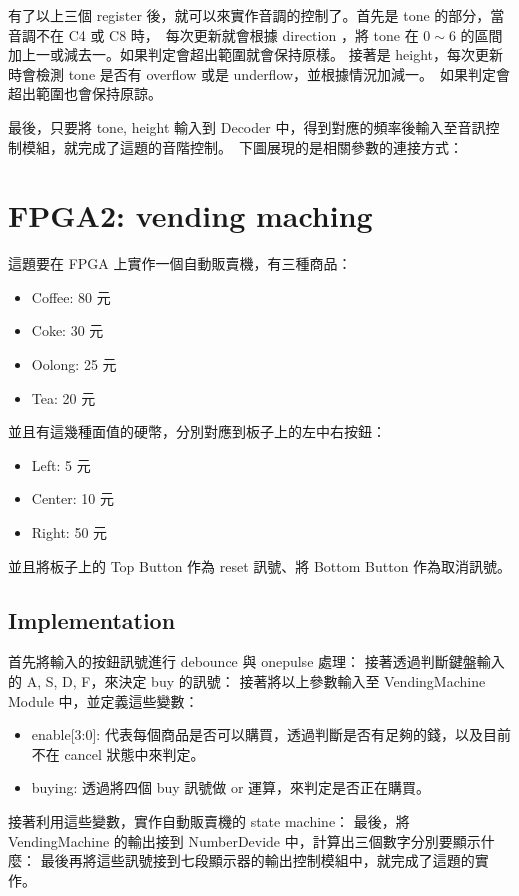 \documentclass[10.5pt,compsoc,UTF8]{CjC}
\theoremstyle{mystyle}
\begin{document}
有了以上三個 register 後，就可以來實作音調的控制了。首先是 tone 的部分，當音調不在 C4 或 C8 時，\
每次更新就會根據 direction ，將 tone 在 $0 \sim 6$ 的區間加上一或減去一。如果判定會超出範圍就會保持原樣。
接著是 height，每次更新時會檢測 tone 是否有 overflow 或是 underflow，並根據情況加減一。\
如果判定會超出範圍也會保持原諒。

最後，只要將 tone, height 輸入到 Decoder 中，得到對應的頻率後輸入至音訊控制模組，就完成了這題的音階控制。\
下圖展現的是相關參數的連接方式：


\section{FPGA2: vending maching}
這題要在 FPGA 上實作一個自動販賣機，有三種商品：
\begin{itemize}
  \item Coffee: 80 元
  \item Coke: 30 元
  \item Oolong: 25 元
  \item Tea: 20 元
\end{itemize}

並且有這幾種面值的硬幣，分別對應到板子上的左中右按鈕：
\begin{itemize}
  \item Left: 5 元
  \item Center: 10 元
  \item Right: 50 元
\end{itemize}

並且將板子上的 Top Button 作為 reset 訊號、將 Bottom  Button 作為取消訊號。

\subsection{Implementation}
首先將輸入的按鈕訊號進行 debounce 與 onepulse 處理：
接著透過判斷鍵盤輸入的 A, S, D, F，來決定 buy 的訊號：
接著將以上參數輸入至 VendingMachine Module 中，並定義這些變數：
\begin{itemize}
  \item enable[3:0]: 代表每個商品是否可以購買，透過判斷是否有足夠的錢，以及目前不在 cancel 狀態中來判定。
  \item buying: 透過將四個 buy 訊號做 or 運算，來判定是否正在購買。
\end{itemize}
接著利用這些變數，實作自動販賣機的 state machine：
最後，將 VendingMachine 的輸出接到 NumberDevide 中，計算出三個數字分別要顯示什麼：
最後再將這些訊號接到七段顯示器的輸出控制模組中，就完成了這題的實作。
\end{document}

